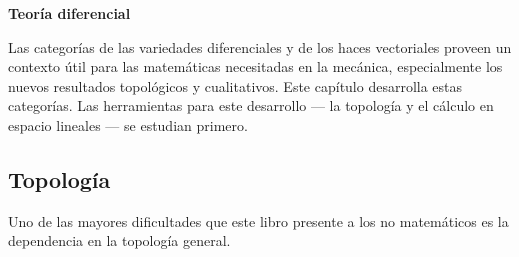 \documentclass[a4paper,10pt]{article}
\numberwithin{equation}{section}
\begin{document}
\vspace{.3cm}

{\Large \textbf{Teoría diferencial}}

\vspace{4cm}

Las categorías de las variedades diferenciales y de los haces vectoriales proveen un 
contexto útil para las matemáticas necesitadas en la mecánica, especialmente los 
nuevos resultados topológicos y cualitativos. Este capítulo desarrolla estas categorías.
Las herramientas para este desarrollo --- la topología y el cálculo en espacio lineales ---
se estudian primero.

\subsection{Topología}

Uno de las mayores dificultades que este libro presente a los no matemáticos es la 
dependencia en la topología general.
\end{document}
